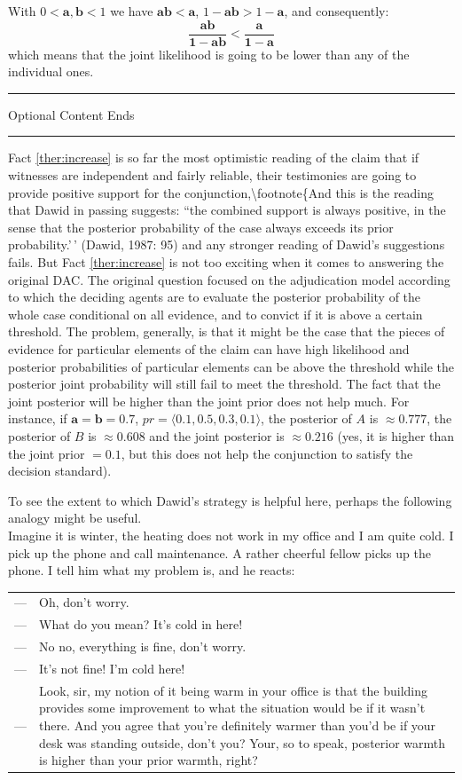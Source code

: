 \documentclass[
  10pt,
  dvipsnames,enabledeprecatedfontcommands]{scrartcl}
\newcommand{\ra}{\rangle}
\newcommand{\la}{\langle}
\newcommand{\intermezzob}{\nopagebreak 
	\begin{minipage}[c]{13cm}
	\begin{center}\rule{10cm}{0.4pt}

	\tiny{\sc Optional Content Ends}
	
	\vspace{-1mm}
	
	\rule{10cm}{0.4pt}\end{center}
	\end{minipage}
	}
\begin{document}
With \(0<\mathbf{a},\mathbf{b}<1\) we have \(\mathbf{ab}<\mathbf{a}\),
\(1-\mathbf{ab}>1-\mathbf{a}\), and consequently:
\[\frac{\mathbf{ab}}{\mathbf{1-ab}} < \frac{\mathbf{a}}{\mathbf{1-a}}\]
which means that the joint likelihood is going to be lower than any of
the individual ones.

\intermezzob

Fact \ref{ther:increase} is so far the most optimistic reading of the
claim that if witnesses are independent and fairly reliable, their
testimonies are going to provide positive support for the
conjunction,\textbackslash footnote\{And this is the reading that Dawid
in passing suggests: ``the combined support is always positive, in the
sense that the posterior probability of the case always exceeds its
prior probability.'\,' (Dawid, 1987: 95) and any stronger reading of
Dawid's suggestions fails. But Fact \ref{ther:increase} is not too
exciting when it comes to answering the original DAC. The original
question focused on the adjudication model according to which the
deciding agents are to evaluate the posterior probability of the whole
case conditional on all evidence, and to convict if it is above a
certain threshold. The problem, generally, is that it might be the case
that the pieces of evidence for particular elements of the claim can
have high likelihood and posterior probabilities of particular elements
can be above the threshold while the posterior joint probability will
still fail to meet the threshold. The fact that the joint posterior will
be higher than the joint prior does not help much. For instance, if
\(\mathbf{a}=\mathbf{b}=0.7\), \(pr=\la 0.1, 0.5, 0.3, 0.1\ra\), the
posterior of \(A\) is \(\approx 0.777\), the posterior of \(B\) is
\(\approx 0.608\) and the joint posterior is \(\approx 0.216\) (yes, it
is higher than the joint prior \(=0.1\), but this does not help the
conjunction to satisfy the decision standard).

To see the extent to which Dawid's strategy is helpful here, perhaps the
following analogy might be useful.\\
Imagine it is winter, the heating does not work in my office and I am
quite cold. I pick up the phone and call maintenance. A rather cheerful
fellow picks up the phone. I tell him what my problem is, and he reacts:

\vspace{1mm}

\begin{tabular}{lp{10cm}}
 --- & Oh, don't worry. \\
 --- & What do you mean? It's cold in here! \\
 --- & No no, everything is fine, don't worry.\\
 --- & It's not fine! I'm cold here! \\
 --- & Look, sir, my notion of it being warm in your office is that the building provides some improvement to what the situation would be if it wasn't there. And you agree that you're definitely warmer than you'd be if your desk was standing outside, don't you? Your, so to speak, posterior warmth is higher than your prior warmth, right? 
 \end{tabular}
 \vspace{1mm}
\end{document}

